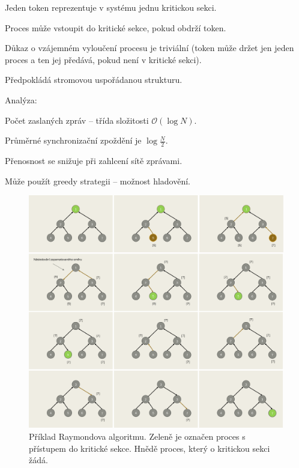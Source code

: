 \begin{compactitem}
    \item Jeden token reprezentuje v systému jednu kritickou sekci.
    \item Proces může vstoupit do kritické sekce, pokud obdrží token.
    \item Důkaz o vzájemném vyloučení procesu je triviální (token může držet jen jeden proces a ten jej předává, pokud není v kritické sekci).
    \item Předpokládá stromovou uspořádanou strukturu.


    \item Analýza: \begin{compactitem}
        \item Počet zaslaných zpráv -- třída složitosti $\mathcal{O}(\log{N})$.
        \item Průměrné synchronizační zpoždění je $\log{\frac{N}{2}}$.
        \item Přenosnost se snižuje při zahlcení sítě zprávami.
        \item Může použít greedy strategii -- možnost hladovění.
    \end{compactitem}

    \begin{figure}[H]
        \centering
        \includegraphics[width=1\linewidth]{raymonduv_algoritmus.png}
        \caption{Příklad Raymondova algoritmu. Zeleně je označen proces s přístupem do kritické sekce. Hnědě proces, který o kritickou sekci žádá.}
    \end{figure}
\end{compactitem}

